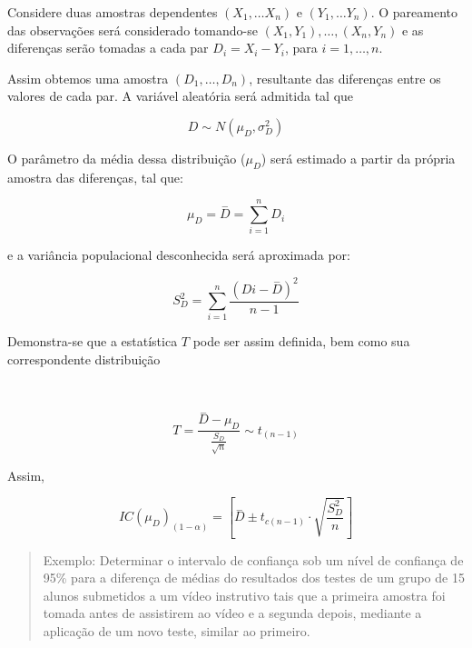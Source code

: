\documentclass[
]{book}
\begin{document}
\hfill\break

Considere duas amostras dependentes \((X_{1}, \dots X_{n})\) e \((Y_{1}, \dots Y_{n})\). O pareamento das observações será considerado tomando-se \((X_{1}, Y_{1}), \dots, (X_{n}, Y_{n})\) e as diferenças serão tomadas a cada par \(D_{i}=X_{i} - Y_{i}\), para \(i=1, \dots, n\).\\

\hfill\break

Assim obtemos uma amostra \((D_{1}, \dots, D_{n})\), resultante das diferenças entre os valores de cada par. A variável aleatória será admitida tal que

\hfill\break

\[
D \sim N (\mu_{D}, \sigma^{2}_{D})
\]

\hfill\break

O parâmetro da média dessa distribuição (\(\mu_{D}\)) será estimado a partir da própria amostra das diferenças, tal que:

\hfill\break

\[
\mu_{D}=\stackrel{-}{D}=\sum_{i=1}^{n}D_{i}
\]

\hfill\break

e a variância populacional desconhecida será aproximada por:

\hfill\break

\[
S^{2}_{D}=\sum_{i=1}^{n}\frac{(D{i}-\stackrel{-}{D})^{2}}{n-1}
\]

\hfill\break

Demonstra-se que a estatística \(T\) pode ser assim definida, bem como sua correspondente distribuição

~

\[
T = \frac{\stackrel{-}{D} -\mu_{D}}{\frac{S_{D}}{\sqrt{n}}}  \sim t_{(n-1)}
\]

\hfill\break

Assim,

\[
IC(\mu_{D})_{(1-\alpha)} = [\stackrel{-}{D} \pm {t}_{c (n-1)} \cdot   \sqrt{\frac{S_{D}^{2}}{n} }  ]
\]

\hfill\break

\begin{quote}
Exemplo: Determinar o intervalo de confiança sob um nível de confiança de 95\% para a diferença de médias do resultados dos testes de um grupo de 15 alunos submetidos a um vídeo instrutivo tais que a primeira amostra foi tomada antes de assistirem ao vídeo e a segunda depois, mediante a aplicação de um novo teste, similar ao primeiro.
\end{quote}
\end{document}
